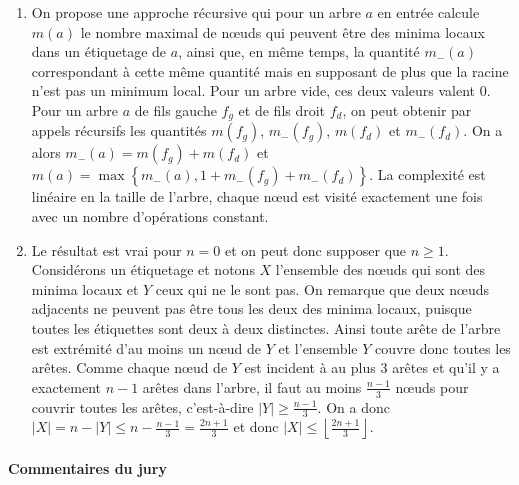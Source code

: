 \documentclass[a4paper, 11pt]{article}
\begin{document}
\begin{enumerate}[resume]
\item On propose une approche récursive qui pour un arbre $a$ en
  entrée calcule $m(a)$ le nombre maximal de n\oe{}uds qui peuvent
  être des minima locaux dans un étiquetage de $a$, ainsi que, en même
  temps, la quantité $m_-(a)$ correspondant à cette même quantité mais
  en supposant de plus que la racine n'est pas un minimum local. Pour
  un arbre vide, ces deux valeurs valent $0$. Pour un arbre $a$ de
  fils gauche $f_g$ et de fils droit $f_d$, on peut obtenir par appels
  récursifs les quantités $m(f_g)$, $m_-(f_g)$, $m(f_d)$ et
  $m_-(f_d)$. On a alors $m_-(a) = m(f_g) + m(f_d)$ et $m(a) =
  \max\left\lbrace m_-(a), 1 + m_-(f_g) + m_-(f_d)\right\rbrace$. La
  complexité est linéaire en la taille de l'arbre, chaque n\oe{}ud est
  visité exactement une fois avec un nombre d'opérations constant.
\item Le résultat est vrai pour $n = 0$ et on peut donc supposer que
  $n \geq 1$. Considérons un étiquetage et notons $X$ l'ensemble des
  n\oe{}uds qui sont des minima locaux et $Y$ ceux qui ne le sont pas.
  On remarque que deux n\oe{}uds adjacents ne peuvent pas être tous
  les deux des minima locaux, puisque toutes les étiquettes sont deux
  à deux distinctes. Ainsi toute arête de l'arbre est extrémité d'au
  moins un n\oe{}ud de $Y$ et l'ensemble $Y$ couvre donc toutes les
  arêtes. Comme chaque n\oe{}ud de $Y$ est incident à au plus $3$
  arêtes et qu'il y a exactement $n - 1$ arêtes dans l'arbre, il faut
  au moins $\frac{n - 1}{3}$ n\oe{}uds pour couvrir toutes les arêtes,
  c'est-à-dire $|Y| \geq \frac{n - 1}{3}$. On a donc $|X| = n - |Y|
  \leq n - \frac{n - 1}{3} = \frac{2n + 1}{3}$ et donc $|X| \leq
  \left\lfloor \frac{2n + 1}{3} \right\rfloor$.
\end{enumerate}

\paragraph{Commentaires du jury}
\end{document}
